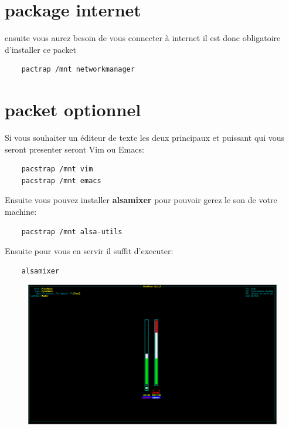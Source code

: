 \documentclass[a4paper]{book}
\begin{document}
  \section{package internet}
  ensuite vous aurez besoin de vous connecter à internet il est donc obligatoire
  d'installer ce packet\\
  \begin{lstlisting}
    pactrap /mnt networkmanager
  \end{lstlisting}
  
  \pagebreak
  \section{packet optionnel}
  Si vous souhaiter un éditeur de texte les deux principaux et
  puissant qui vous seront presenter seront Vim ou Emacs\@:\\
  \begin{lstlisting}
    pacstrap /mnt vim
    pacstrap /mnt emacs
  \end{lstlisting}
  Ensuite vous pouvez installer \textbf{alsamixer} pour pouvoir gerez le son de
  votre machine\@:\\
  \begin{lstlisting}
    pacstrap /mnt alsa-utils
  \end{lstlisting}
  Ensuite pour vous en servir il suffit d'executer\@:
  \begin{lstlisting}
    alsamixer
  \end{lstlisting}
  \begin{figure}[h]
    \includegraphics[width=\textwidth]{images/Alsamixer}
  \end{figure}
\end{document}
